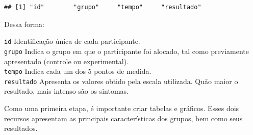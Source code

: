 \documentclass[
]{book}
\newenvironment{Shaded}{\begin{snugshade}}{\end{snugshade}}
\newcommand{\DataTypeTok}[1]{\textcolor[rgb]{0.13,0.29,0.53}{#1}}
\newcommand{\KeywordTok}[1]{\textcolor[rgb]{0.13,0.29,0.53}{\textbf{#1}}}
\newcommand{\NormalTok}[1]{#1}
\newcommand{\OperatorTok}[1]{\textcolor[rgb]{0.81,0.36,0.00}{\textbf{#1}}}
\newcommand{\OtherTok}[1]{\textcolor[rgb]{0.56,0.35,0.01}{#1}}
\newcommand{\StringTok}[1]{\textcolor[rgb]{0.31,0.60,0.02}{#1}}
\begin{document}
\begin{verbatim}
## [1] "id"        "grupo"     "tempo"     "resultado"
\end{verbatim}

Dessa forma:

\texttt{id} Identificação única de cada participante.\\
\texttt{grupo} Indica o grupo em que o participante foi alocado, tal
como previamente apresentado (controle ou experimental).\\
\texttt{tempo} Indica cada um dos 5 pontos de medida.\\
\texttt{resultado} Apresenta os valores obtido pela escala utilizada.
Quão maior o resultado, mais intenso são os sintomas.

Como uma primeira etapa, é importante criar tabelas e gráficos. Esses
dois recursos apresentam as principais características dos grupos, bem
como seus resultados.

\begin{Shaded}
\end{Shaded}
\end{document}
